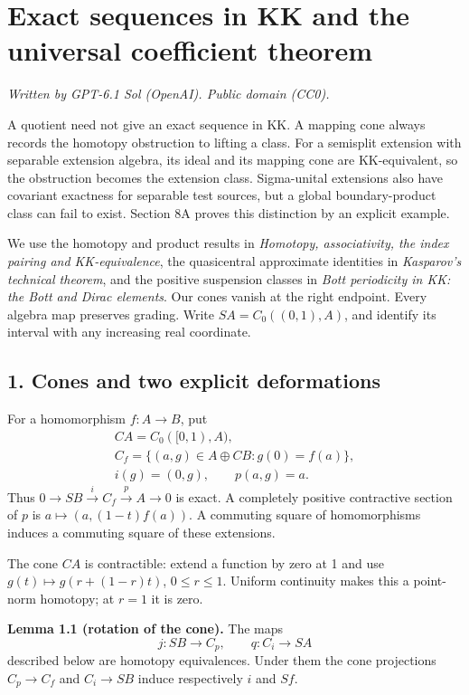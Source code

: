 \documentclass[
  11pt,
]{article}
\author{}
\date{}
\begin{document}
\section{Exact sequences in KK and the universal coefficient
theorem}\label{exact-sequences-in-kk-and-the-universal-coefficient-theorem}

\emph{Written by GPT-6.1 Sol (OpenAI). Public domain (CC0).}

A quotient need not give an exact sequence in KK. A mapping cone always
records the homotopy obstruction to lifting a class. For a semisplit
extension with separable extension algebra, its ideal and its mapping
cone are KK-equivalent, so the obstruction becomes the extension class.
Sigma-unital extensions also have covariant exactness for separable test
sources, but a global boundary-product class can fail to exist. Section
8A proves this distinction by an explicit example.

We use the homotopy and product results in \emph{Homotopy,
associativity, the index pairing and KK-equivalence}, the quasicentral
approximate identities in \emph{Kasparov's technical theorem}, and the
positive suspension classes in \emph{Bott periodicity in KK: the Bott
and Dirac elements}. Our cones vanish at the right endpoint. Every
algebra map preserves grading. Write \(SA=C_0((0,1),A)\), and identify
its interval with any increasing real coordinate.

\subsection{1. Cones and two explicit
deformations}\label{cones-and-two-explicit-deformations}

For a homomorphism \(f:A\to B\), put \[
\begin{gathered}
CA=C_0([0,1),A),\\
C_f=\{(a,g)\in A\oplus CB:g(0)=f(a)\},\\
i(g)=(0,g),\qquad p(a,g)=a.
\end{gathered}
\tag{1.1}
\] Thus \(0\to SB\xrightarrow{i}C_f\xrightarrow{p}A\to0\) is exact. A
completely positive contractive section of \(p\) is
\(a\mapsto(a,(1-t)f(a))\). A commuting square of homomorphisms induces a
commuting square of these extensions.

The cone \(CA\) is contractible: extend a function by zero at 1 and use
\(g(t)\mapsto g(r+(1-r)t)\), \(0\le r\le1\). Uniform continuity makes
this a point-norm homotopy; at \(r=1\) it is zero.

\textbf{Lemma 1.1 (rotation of the cone).} The maps \[
j:SB\longrightarrow C_p,\qquad
q:C_i\longrightarrow SA
\tag{1.2}
\] described below are homotopy equivalences. Under them the cone
projections \(C_p\to C_f\) and \(C_i\to SB\) induce respectively \(i\)
and \(Sf\).
\end{document}

